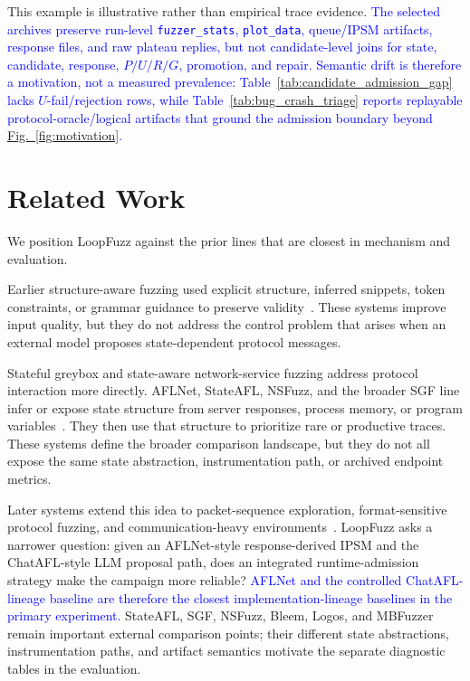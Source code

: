 \documentclass[final,5p,times,number]{elsarticle}
\newcommand{\figref}[1]{\hyperref[#1]{Fig.~\ref*{#1}}}
\begin{document}
This example is illustrative rather than empirical trace evidence. \textcolor{blue}{The selected archives preserve run-level \texttt{fuzzer\_stats}, \texttt{plot\_data}, queue/IPSM artifacts, response files, and raw plateau replies, but not candidate-level joins for state, candidate, response, $P/U/R/G$, promotion, and repair. Semantic drift is therefore a motivation, not a measured prevalence: Table~\ref{tab:candidate_admission_gap} lacks $U$-fail/rejection rows, while Table~\ref{tab:bug_crash_triage} reports replayable protocol-oracle/logical artifacts that ground the admission boundary beyond \figref{fig:motivation}.}

\section{Related Work}
We position LoopFuzz against the prior lines that are closest in mechanism and evaluation.

Earlier structure-aware fuzzing used explicit structure, inferred snippets, token constraints, or grammar guidance to preserve validity~\cite{snipuzz_black_box_fuzzing_2021,token_level_fuzzing_2021,gramatron_effective_grammar_aware_2021,griffin_grammar_free_dbms_2022,no_grammar_no_problem_2023,likely_invariants_feedback_2021,mundofuzz_grammar_inference_2022}. These systems improve input quality, but they do not address the control problem that arises when an external model proposes state-dependent protocol messages.

Stateful greybox and state-aware network-service fuzzing address protocol interaction more directly. AFLNet, StateAFL, NSFuzz, and the broader SGF line infer or expose state structure from server responses, process memory, or program variables~\cite{aflnet,stateafl,nsfuzz,sgf_usenix22,profuzzbench_benchmark_stateful_protocol_2021}. They then use that structure to prioritize rare or productive traces. These systems define the broader comparison landscape, but they do not all expose the same state abstraction, instrumentation path, or archived endpoint metrics.

Later systems extend this idea to packet-sequence exploration, format-sensitive protocol fuzzing, and communication-heavy environments~\cite{bleem_packet_sequence_2023,formatted_stateful_greybox_fuzzing_2024,logos_log_guided_fuzzing_2024,msgfuzzer_message_sequence_guided_2024,resolverfuzz_query_response_2024,mbfuzzer_mqtt_2025,fuzzusb_hybrid_stateful_fuzzing_2022,dtls_fuzzer_dtls_protocol_2022,edhoc_fuzzer_edhoc_protocol_2023,tron_fuzzing_linux_network_2025}. LoopFuzz asks a narrower question: given an AFLNet-style response-derived IPSM and the ChatAFL-style LLM proposal path, does an integrated runtime-admission strategy make the campaign more reliable? \textcolor{blue}{AFLNet and the controlled ChatAFL-lineage baseline are therefore the closest implementation-lineage baselines in the primary experiment.} StateAFL, SGF, NSFuzz, Bleem, Logos, and MBFuzzer remain important external comparison points; their different state abstractions, instrumentation paths, and artifact semantics motivate the separate diagnostic tables in the evaluation.
\end{document}
